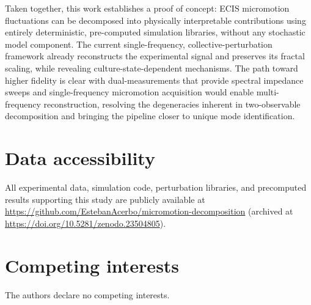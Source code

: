 \documentclass[english, 10pt, a4paper]{article}
\begin{document}
Taken together, this work establishes a proof of concept: ECIS micromotion fluctuations can be decomposed into physically interpretable contributions using entirely deterministic, pre-computed simulation libraries, without any stochastic model component. The current single-frequency, collective-perturbation framework already reconstructs the experimental signal and preserves its fractal scaling, while revealing culture-state-dependent mechanisms. The path toward higher fidelity is clear with dual-measurements that provide spectral impedance sweeps and single-frequency micromotion acquisition would enable multi-frequency reconstruction, resolving the degeneracies inherent in two-observable decomposition and bringing the pipeline closer to unique mode identification.

\section*{Data accessibility}
All experimental data, simulation code, perturbation libraries, and precomputed results supporting this study are publicly available at \url{https://github.com/EstebanAcerbo/micromotion-decomposition} (archived at \url{https://doi.org/10.5281/zenodo.23504805}).

\section*{Competing interests}
The authors declare no competing interests.



\end{document}

